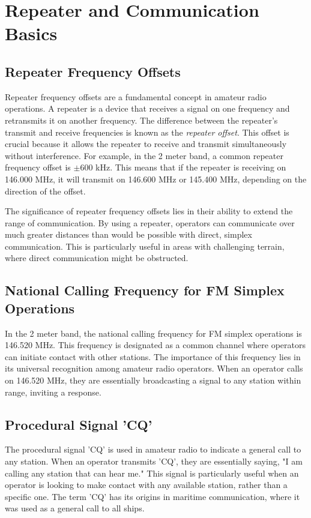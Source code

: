 \section{Repeater and Communication Basics}
\label{section:repeater_basics}

\subsection*{Repeater Frequency Offsets}
Repeater frequency offsets are a fundamental concept in amateur radio operations. A repeater is a device that receives a signal on one frequency and retransmits it on another frequency. The difference between the repeater's transmit and receive frequencies is known as the \textit{repeater offset}. This offset is crucial because it allows the repeater to receive and transmit simultaneously without interference. For example, in the 2 meter band, a common repeater frequency offset is $\pm 600$ kHz. This means that if the repeater is receiving on 146.000 MHz, it will transmit on 146.600 MHz or 145.400 MHz, depending on the direction of the offset.

The significance of repeater frequency offsets lies in their ability to extend the range of communication. By using a repeater, operators can communicate over much greater distances than would be possible with direct, simplex communication. This is particularly useful in areas with challenging terrain, where direct communication might be obstructed.

\subsection*{National Calling Frequency for FM Simplex Operations}
In the 2 meter band, the national calling frequency for FM simplex operations is 146.520 MHz. This frequency is designated as a common channel where operators can initiate contact with other stations. The importance of this frequency lies in its universal recognition among amateur radio operators. When an operator calls on 146.520 MHz, they are essentially broadcasting a signal to any station within range, inviting a response.

\subsection*{Procedural Signal 'CQ'}
The procedural signal 'CQ' is used in amateur radio to indicate a general call to any station. When an operator transmits 'CQ', they are essentially saying, "I am calling any station that can hear me." This signal is particularly useful when an operator is looking to make contact with any available station, rather than a specific one. The term 'CQ' has its origins in maritime communication, where it was used as a general call to all ships.

